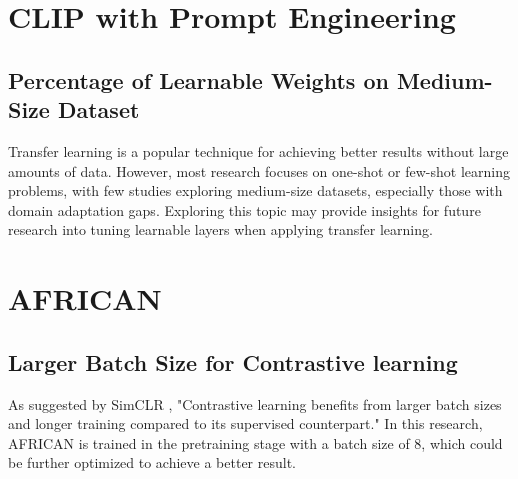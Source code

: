 \section{CLIP with Prompt Engineering}


\subsection{Percentage of Learnable Weights on Medium-Size Dataset}
Transfer learning is a popular technique for achieving better results without large amounts of data. However, most research focuses on one-shot or few-shot learning problems, with few studies exploring medium-size datasets, especially those with domain adaptation gaps. Exploring this topic may provide insights for future research into tuning learnable layers when applying transfer learning.

\section{AFRICAN}
\subsection{Larger Batch Size for Contrastive learning}
As suggested by SimCLR \parencite{pmlr-v119-chen20j}, "Contrastive learning benefits from larger batch sizes and longer training compared to its supervised counterpart." In this research, AFRICAN is trained in the pretraining stage with a batch size of 8, which could be further optimized to achieve a better result.

